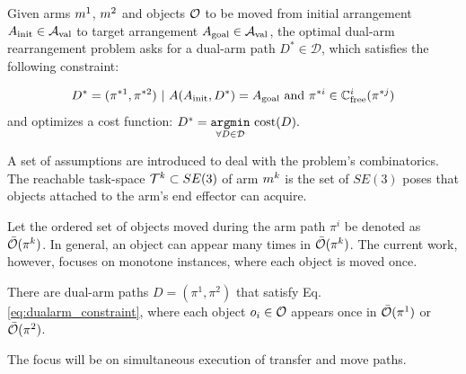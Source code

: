 \vspace{-.1in}
{ Given arms $m^1$, $m^2$ and objects $\mathcal{O}$ to be moved from initial arrangement $ A_{\rm init} \in \mathcal{A}_{\rm val}$ to target arrangement $ A_{\rm goal} \in \mathcal{A}_{\rm val} $, the optimal dual-arm rearrangement problem asks for a dual-arm path $D^* \in \mathcal{D}$, which satisfies the following constraint:

\vspace{-.15in} 
\begin{equation}
D^* =  (\pi^{*1}, \pi^{*2}) \ |\ \arrangement(\ainit, D^*) = \atarget \textrm{ and } \pi^{*i} \in \cfree^i(\pi^{*j}) \vspace{-.05in}
\label{eq:dualarm_constraint}
\end{equation}
\noindent and optimizes a cost function: $D^* = \underset{ \forall D \in \mathcal{D}}{ \mathtt{argmin} } \ \textup{cost}(D).$}

A set of assumptions are introduced to deal with the problem's combinatorics. The reachable task-space $\mathcal{T}^k \subset SE(3)$ of arm $m^k$ is the set of $SE(3)$ poses that objects attached to the arm's end effector can acquire.


Let the ordered set of objects moved during the arm path $ \pi^i $ be denoted as $ \bar{\mathcal{O}}(\pi^k) $. In general, an object can appear many times in $ \bar{\mathcal{O}}(\pi^k) $. The current work, however, focuses on monotone instances, where each object is moved once.

\vspace{-.15in}
{\assumption [Monotonicity] There are dual-arm paths $D = (\pi^1,\pi^2)$ that satisfy Eq. \ref{eq:dualarm_constraint}, where each object $ o_i \in \mathcal{O} $ appears once in $\bar{\mathcal{O}}(\pi^1)$ or $ \bar{\mathcal{O}}(\pi^2)$.}

The focus will be on simultaneous execution of transfer and move paths. 

